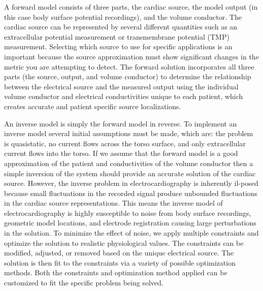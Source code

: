 A forward model consists of three parts, the cardiac source, the model
output (in this case body surface potential recordings), and the volume
conductor. The cardiac source can be represented by several different
quantities such as an extracellular potential measurement or transmembrane
potential (TMP) measurement. Selecting which source to use for specific
applications is an important because the source approximation must show
significant changes in the metric you are attempting to detect. The forward
solution incorporates all three parts (the source, output, and volume
conductor) to determine the relationship between the electrical source and
the measured output using the individual volume conductor and electrical
conductivities unique to each patient, which creates accurate and patient
specific source localizations.

An inverse model is simply the forward model in reverse. To implement an inverse model several initial
assumptions must be made, which are: the problem is quasistatic, no current
flows across the torso surface, and only extracellular current flows into
the torso. If we assume that
the forward model is a good approximation of the patient and conductivities
of the volume conductor then a simple inversion of the system should
provide an accurate solution of the cardiac source. However, the inverse
problem in electrocardiography is inherently il-posed because small
fluctuations in the recorded signal produce unbounded fluctuations in the
cardiac source representations. This means the inverse model of
electrocardiography is highly susceptible to noise from body surface
recordings, geometric model locations, and electrode registration causing
large perturbations in the solution. To minimize the effect of noise, we
apply multiple constraints and optimize the solution to realistic
physiological values. The constraints can be modified, adjusted, or
removed based on the unique electrical source. The solution is then fit to
the constraints via a variety of possible optimization methods. Both the
constraints and optimization method applied can be customized to fit the
specific problem being solved.


